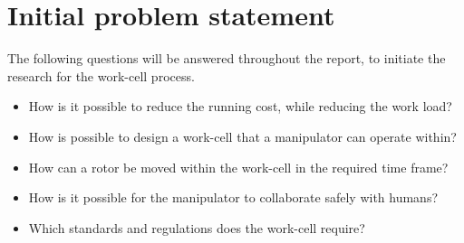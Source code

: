 \section{Initial problem statement}\label{ch:Initial problem statment}


The following questions will be answered throughout the report, to initiate the research for the work-cell process.

\begin{itemize}
    \item How is it possible to reduce the running cost, while reducing the work load?
    \item How is possible to design a work-cell that a manipulator can operate within?
    \item How can a rotor be moved within the work-cell in the required time frame?
    \item How is it possible for the manipulator to collaborate safely with humans?
    \item Which standards and regulations does the work-cell require?
\end{itemize}

